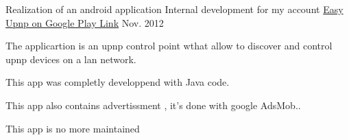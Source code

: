 \begin{cventries}

\cventry
{Realization of an android application } %
{Internal development for my account } %
{ \href{https://play.google.com/store/apps/details?id=com.EasySoft.easyup}{Easy Upnp on Google Play Link} } %
{Nov. 2012} %
{ %
\begin{cvitems}
\item {The applicartion is an upnp control point wthat allow to discover and control upnp devices on a lan network.}
\item {This app was completly developpend with Java code.}
\item {This app also contains advertissment , it's done with google AdsMob..}
\item {This app is no more maintained}
\end{cvitems}
}



\end{cventries}